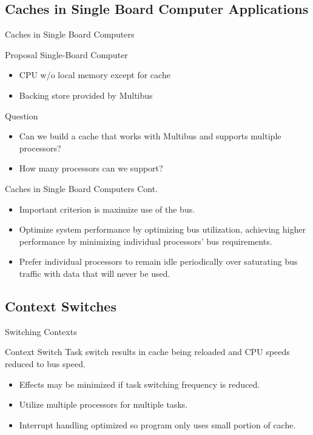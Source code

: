 \documentclass{beamer}
\begin{document}
\subsection{Caches in Single Board Computer Applications}

\begin{frame}{Caches in Single Board Computers}
	\begin{block}{Proposal}
		Single-Board Computer	
		\begin{itemize}
			\item{
				CPU w/o local memory except for cache
			}
			\item{
				Backing store provided by Multibus
			}
		\end{itemize}
		\pause
	\end{block}
	\begin{block}{Question}
		\begin{itemize}
			\item {
				Can we build a cache that works with Multibus and supports multiple processors?
			}
			\item{
				How many processors can we support?	
			}
		\end{itemize}
	\end{block}
	
\end{frame}

\begin{frame}{Caches in Single Board Computers Cont.}
	\begin{itemize}
		\item {
			Important criterion is maximize use of the bus.
		}
		\item{
			Optimize system performance by optimizing bus utilization, achieving higher performance by minimizing individual processors' bus requirements.
		}
		\item{
			Prefer individual processors to remain idle periodically over saturating bus traffic with data that will never be used.
		}
	\end{itemize}
\end{frame}

\subsection{Context Switches}

\begin{frame}{Switching Contexts}
	\begin{block}{Context Switch}
		Task switch results in cache being reloaded and CPU speeds reduced to bus speed.
	\end{block}
	\begin{itemize}
		\item {
			Effects may be minimized if task switching frequency is reduced.
		}
		\item{
			Utilize multiple processors for multiple tasks.
		}
		\item{
			Interrupt handling optimized so program only uses small portion of cache.
		}
		
	\end{itemize}
\end{frame}
\end{document}
